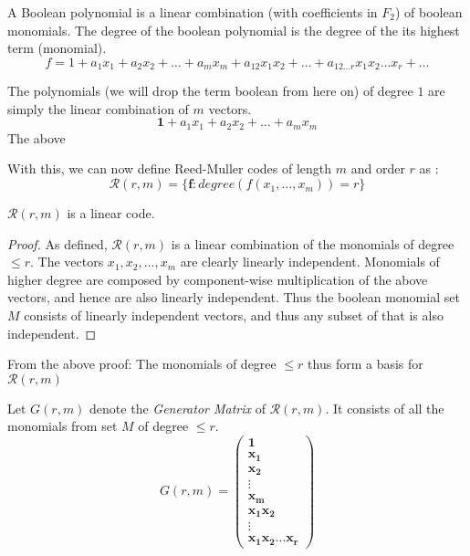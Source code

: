 \documentclass{article}
\newcommand{\RM}[2]{\ensuremath{\mathcal{R}(#1,#2)}}
\newcommand{\rem}{Reed-Muller}
\newcommand{\V}[1]{\ensuremath{\mathbf{#1}}}
\theoremstyle{plain}
\begin{document}
A Boolean polynomial is a linear combination (with coefficients in $F_2$) of boolean monomials. The degree of the boolean polynomial is the degree of the its highest term (monomial).
\begin{equation*}
  f = 1 + a_1x_1+a_2x_2+\ldots+a_mx_m + a_{12}x_1x_2+\ldots+a_{12\ldots r}x_1x_2\ldots x_r+\ldots
\end{equation*}


The polynomials (we will drop the term boolean from here on) of degree $1$ are simply the linear combination of $m$ vectors.
\begin{equation}
 \V{1}+a_1x_1+a_2x_2+\ldots+a_mx_m
\end{equation}
The above 

With this, we can now define \rem{} codes of length $m$ and order $r$  as :
\begin{equation}
\RM{r}{m} = \{\V{f} : degree(f(x_1,\ldots,x_m)) = r \} 
\end{equation}


\begin{lemma}
  $\RM{r}{m}$ is a linear code.
  \begin{proof}
As defined, $\RM{r}{m}$ is a linear combination of the monomials of degree $\leq r$. 
The vectors $x_1,x_2,\ldots,x_m$ are clearly linearly independent.
Monomials of higher degree are composed by component-wise multiplication of the above vectors, and hence are also linearly independent.
Thus the boolean monomial set $M$ consists of linearly independent vectors, and thus any subset of that is also independent. 
  \end{proof}
\end{lemma}

From the above proof:
The monomials of degree $\leq r$ thus form a basis for $\RM{r}{m}$

Let $G(r,m)$ denote the \emph{Generator Matrix} of $\RM{r}{m}$. It consists of all the monomials from set $M$ of degree $\leq r$.
\begin{equation}
  \label{eq:5}
  G(r,m) =
  \begin{pmatrix}
    \V{1} \\
    \V{x_1} \\
    \V{x_2} \\
    \vdots \\
    \V{x_m} \\
    \V{x_1x_2} \\
    \vdots \\
    \V{x_1x_2\ldots x_r}
  \end{pmatrix}
\end{equation}
\end{document}
